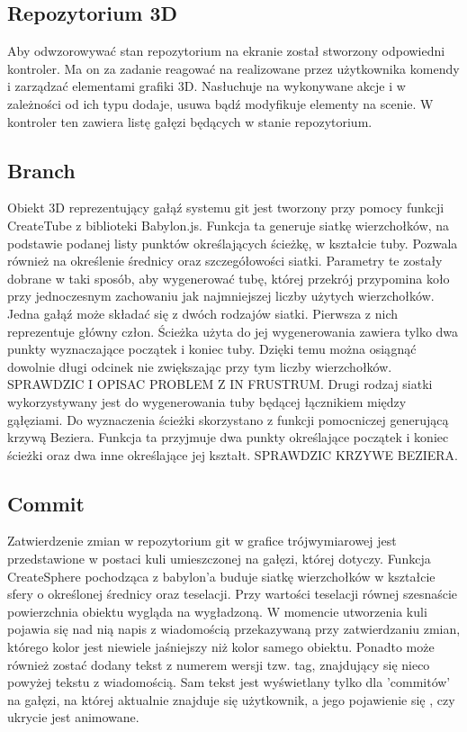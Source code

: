 \documentclass[11pt,a4paper,polish,thesis]{dcsbook}
\begin{document}
	

	\subsection{Repozytorium 3D}
		Aby odwzorowywać stan repozytorium na ekranie został stworzony odpowiedni kontroler. Ma on za zadanie reagować na realizowane przez użytkownika komendy i zarządzać elementami grafiki 3D. Nasłuchuje na wykonywane akcje i w zależności od ich typu dodaje, usuwa bądź modyfikuje elementy na scenie. W kontroler ten zawiera listę gałęzi będących w stanie repozytorium. %

	\subsection{Branch}
	Obiekt 3D reprezentujący gałąź systemu git jest tworzony przy pomocy funkcji CreateTube z biblioteki Babylon.js. 
	Funkcja ta generuje siatkę wierzchołków, na podstawie podanej listy punktów określających ścieżkę, w kształcie tuby. Pozwala również na określenie średnicy oraz
	szczegółowości siatki. Parametry te zostały dobrane w taki sposób, aby wygenerować tubę, której przekrój przypomina koło przy jednoczesnym zachowaniu jak najmniejszej liczby użytych wierzchołków. Jedna gałąź może składać się z dwóch rodzajów siatki. Pierwsza z nich reprezentuje główny człon. Ścieżka użyta do jej wygenerowania zawiera tylko dwa punkty wyznaczające początek i koniec tuby. Dzięki temu można osiągnąć dowolnie długi odcinek nie zwiększając przy tym liczby wierzchołków. SPRAWDZIC I OPISAC PROBLEM Z IN FRUSTRUM. Drugi rodzaj siatki wykorzystywany jest do wygenerowania tuby będącej łącznikiem między gąłęziami. Do wyznaczenia ścieżki skorzystano z funkcji pomocniczej generującą krzywą Beziera. Funkcja ta przyjmuje dwa punkty określające początek i koniec ścieżki oraz dwa inne określające jej kształt. SPRAWDZIC KRZYWE BEZIERA. 

	\subsection{Commit}
	Zatwierdzenie zmian w repozytorium git w grafice trójwymiarowej jest przedstawione w postaci kuli umieszczonej na gałęzi, której dotyczy. Funkcja CreateSphere pochodząca z babylon'a buduje siatkę wierzchołków w kształcie sfery o określonej średnicy oraz teselacji. Przy wartości teselacji równej szesnaście powierzchnia obiektu wygląda na wygładzoną. W momencie utworzenia kuli  pojawia się nad nią napis z wiadomością przekazywaną przy zatwierdzaniu zmian, którego kolor jest niewiele jaśniejszy niż kolor samego obiektu. Ponadto może również zostać dodany tekst z numerem wersji tzw. tag, znajdujący się nieco powyżej tekstu z wiadomością. Sam tekst jest wyświetlany tylko dla 'commitów' na gałęzi, na której aktualnie znajduje się użytkownik, a jego pojawienie się , czy ukrycie jest animowane. 
\end{document}
